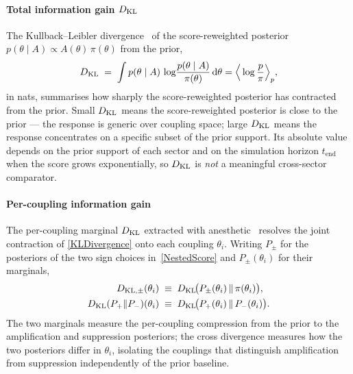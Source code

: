 \paragraph*{Total information gain $D_\mathrm{KL}$}
The Kullback--Leibler
divergence~\cite{Kullback:1951zyt,Handley:2019mfs} of the
score-reweighted posterior
$p(\theta\mid A)\propto A(\theta)\,\pi(\theta)$ from the prior,
\begin{equation}
  D_{\mathrm{KL}}
  \;=\; \int p(\theta\mid A)\,
  \log\!\frac{p(\theta\mid A)}{\pi(\theta)}\,\mathrm{d}\theta = \Big\langle\log \frac{p}{\pi}\Big\rangle_{p},
  \label{KLDivergence}
\end{equation}
in nats, summarises how sharply the score-reweighted posterior
has contracted from the prior. Small $D_\mathrm{KL}$ means the
score-reweighted posterior is close to the prior --- the
response is generic over coupling space; large $D_\mathrm{KL}$ means the
response concentrates on a specific subset of the prior support.
Its absolute value depends on the prior support of each sector
and on the simulation horizon $t_\mathrm{end}$ when the score grows
exponentially, so $D_\mathrm{KL}$ is \emph{not} a meaningful cross-sector
comparator.

\paragraph*{Per-coupling information gain}
The per-coupling marginal $D_\mathrm{KL}$ extracted with
anesthetic~\cite{Handley:2019mfs} resolves the joint contraction of
\cref{KLDivergence} onto each coupling $\theta_i$. Writing $P_\pm$
for the posteriors of the two sign choices in~\cref{NestedScore}
and $P_\pm(\theta_i)$ for their marginals,
\begin{align}
  D_{\mathrm{KL},\pm}(\theta_i) &\;\equiv\;
    D_\mathrm{KL}\!\big(P_\pm(\theta_i)\,\|\,\pi(\theta_i)\big),
    \notag\\
  D_\mathrm{KL}(P_+\|P_-)(\theta_i) &\;\equiv\;
    D_\mathrm{KL}\!\big(P_+(\theta_i)\,\|\,P_-(\theta_i)\big).
  \label{PerCouplingKL}
\end{align}
The two marginals measure the per-coupling compression from the
prior to the amplification and suppression posteriors; the cross
divergence measures how the two posteriors differ in $\theta_i$,
isolating the couplings that distinguish amplification from
suppression independently of the prior baseline.

